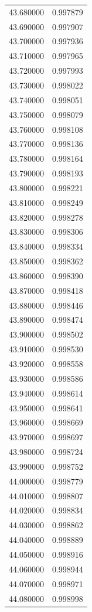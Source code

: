 \begin{tabular}{rr}
43.680000 & 0.997879 \\
43.690000 & 0.997907 \\
43.700000 & 0.997936 \\
43.710000 & 0.997965 \\
43.720000 & 0.997993 \\
43.730000 & 0.998022 \\
43.740000 & 0.998051 \\
43.750000 & 0.998079 \\
43.760000 & 0.998108 \\
43.770000 & 0.998136 \\
43.780000 & 0.998164 \\
43.790000 & 0.998193 \\
43.800000 & 0.998221 \\
43.810000 & 0.998249 \\
43.820000 & 0.998278 \\
43.830000 & 0.998306 \\
43.840000 & 0.998334 \\
43.850000 & 0.998362 \\
43.860000 & 0.998390 \\
43.870000 & 0.998418 \\
43.880000 & 0.998446 \\
43.890000 & 0.998474 \\
43.900000 & 0.998502 \\
43.910000 & 0.998530 \\
43.920000 & 0.998558 \\
43.930000 & 0.998586 \\
43.940000 & 0.998614 \\
43.950000 & 0.998641 \\
43.960000 & 0.998669 \\
43.970000 & 0.998697 \\
43.980000 & 0.998724 \\
43.990000 & 0.998752 \\
44.000000 & 0.998779 \\
44.010000 & 0.998807 \\
44.020000 & 0.998834 \\
44.030000 & 0.998862 \\
44.040000 & 0.998889 \\
44.050000 & 0.998916 \\
44.060000 & 0.998944 \\
44.070000 & 0.998971 \\
44.080000 & 0.998998 \\

\end{tabular}
